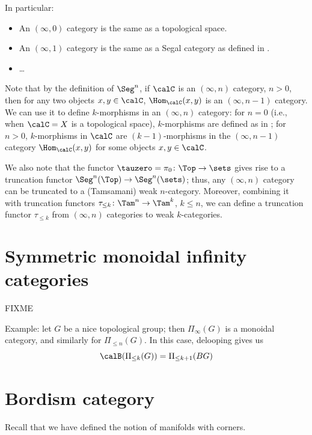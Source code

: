 In particular:
\begin{itemize}
  \item An $(\infty, 0)$ category is the same as a topological space.
  \item An $(\infty, 1)$ category is the same as a Segal category as defined
    in .
  \item \dots
\end{itemize}

Note that by the definition of $\Seg^n$, if $\calC$ is an $(\infty, n)$
category, $n>0$, then for any two objects $x,y\in \calC$, $\Hom_\calC(x,y)$ is
an $(\infty, n-1)$ category. We can use it to define $k$-morphisms in an
$(\infty, n)$ category: for $n=0$ (i.e., when $\calC=X$ is a topological space),
$k$-morphisms are defined as in ; for $n>0$,
$k$-morphisms in $\calC$ are $(k-1)$-morphisms in the $(\infty, n-1)$ category
$\Hom_{\calC}(x,y)$ for some objects $x,y\in \calC$.

We also note that the functor $\tauzero=\pi_0\colon \Top\to\sets$ gives rise to
a truncation functor $\Seg^n(\Top)\to \Seg^n(\sets)$; thus, any $(\infty, n)$
category can be truncated to a (Tamsamani) weak $n$-category. Moreover,
combining it with truncation functors $\tau_{\leq k}\colon \Tam^n\to \Tam^k$, $k
\le n$, we can define a truncation functor $\tau_{\leq k}$ from $(\infty, n)$
categories to weak $k$-categories.


\section{Symmetric monoidal infinity categories}\label{s:monoidal-infty}

FIXME

Example: let $G$ be a nice topological group; then $\Pi_\infty(G)$ is a
monoidal category, and similarly for $\Pi_{\le n}(G)$. In this case, delooping
gives us
$$
\calB(\Pi_{\le k}(G))=\Pi_{\le k+1}(BG)
$$





\section{Bordism category}\label{s:bordn-highercat}
Recall that we have defined the notion of manifolds with corners.


